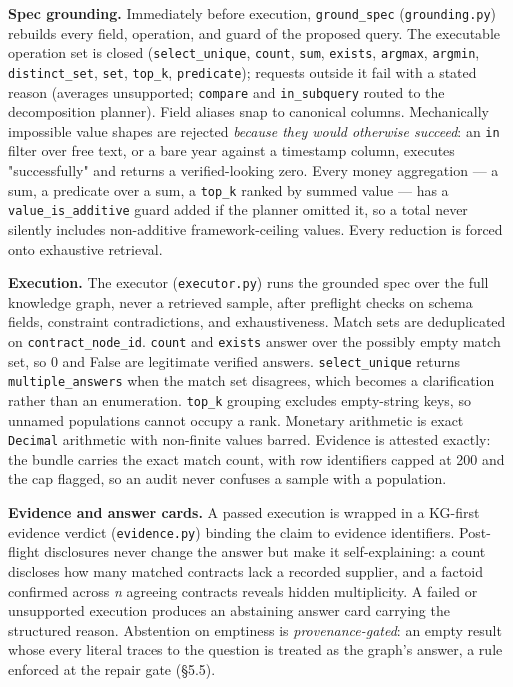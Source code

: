 \textbf{Spec grounding.} Immediately before execution, \texttt{ground\_spec} (\texttt{grounding.py}) rebuilds every field, operation, and guard of the proposed query. The executable operation set is closed (\texttt{select\_unique}, \texttt{count}, \texttt{sum}, \texttt{exists}, \texttt{argmax}, \texttt{argmin}, \texttt{distinct\_set}, \texttt{set}, \texttt{top\_k}, \texttt{predicate}); requests outside it fail with a stated reason (averages unsupported; \texttt{compare} and \texttt{in\_subquery} routed to the decomposition planner). Field aliases snap to canonical columns. Mechanically impossible value shapes are rejected \emph{because they would otherwise succeed}: an \texttt{in} filter over free text, or a bare year against a timestamp column, executes "successfully" and returns a verified-looking zero. Every money aggregation --- a sum, a predicate over a sum, a \texttt{top\_k} ranked by summed value --- has a \texttt{value\_is\_additive} guard added if the planner omitted it, so a total never silently includes non-additive framework-ceiling values. Every reduction is forced onto exhaustive retrieval.

\textbf{Execution.} The executor (\texttt{executor.py}) runs the grounded spec over the full knowledge graph, never a retrieved sample, after preflight checks on schema fields, constraint contradictions, and exhaustiveness. Match sets are deduplicated on \texttt{contract\_node\_id}. \texttt{count} and \texttt{exists} answer over the possibly empty match set, so 0 and False are legitimate verified answers. \texttt{select\_unique} returns \texttt{multiple\_answers} when the match set disagrees, which becomes a clarification rather than an enumeration. \texttt{top\_k} grouping excludes empty-string keys, so unnamed populations cannot occupy a rank. Monetary arithmetic is exact \texttt{Decimal} arithmetic with non-finite values barred. Evidence is attested exactly: the bundle carries the exact match count, with row identifiers capped at 200 and the cap flagged, so an audit never confuses a sample with a population.

\textbf{Evidence and answer cards.} A passed execution is wrapped in a KG-first evidence verdict (\texttt{evidence.py}) binding the claim to evidence identifiers. Post-flight disclosures never change the answer but make it self-explaining: a count discloses how many matched contracts lack a recorded supplier, and a factoid confirmed across \emph{n} agreeing contracts reveals hidden multiplicity. A failed or unsupported execution produces an abstaining answer card carrying the structured reason. Abstention on emptiness is \emph{provenance-gated}: an empty result whose every literal traces to the question is treated as the graph's answer, a rule enforced at the repair gate (§5.5).

